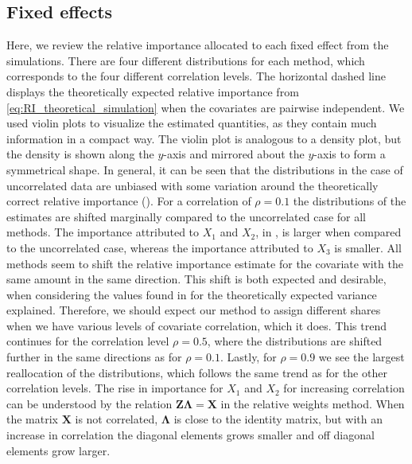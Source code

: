 \subsection{Fixed effects}
\label{sec:relimp_fixed}
Here, we review the relative importance allocated to each fixed effect from the simulations.
There are four different distributions for each method, which corresponds to the four different correlation levels. 
The horizontal dashed line displays the theoretically expected relative importance from \eqref{eq:RI_theoretical_simulation} when the covariates are pairwise independent. We used violin plots to visualize the estimated quantities, as they contain much information in a compact way. The violin plot is analogous to a density plot, but the density is shown along the $y$-axis and mirrored about the $y$-axis to form a symmetrical shape.
\newline
\newline
In general, it can be seen that the distributions in the case of uncorrelated data are unbiased with some variation around the theoretically correct relative importance ().
For a correlation of $\rho=0.1$ the distributions of the estimates are shifted marginally compared to the uncorrelated case for all methods.
The importance attributed to $X_1$ and $X_2$, in , is larger when compared to the uncorrelated case, whereas the importance attributed to $X_3$ is smaller.
All methods seem to shift the relative importance estimate for the covariate with the same amount in the same direction.
This shift is both expected and desirable, when considering the values found in  for the theoretically expected variance explained. 
Therefore, we should expect our method to assign different shares when we have various levels of covariate correlation, which it does.
This trend continues for the correlation level $\rho=0.5$, where the distributions are shifted further in the same directions as for $\rho=0.1$.
Lastly, for $\rho=0.9$ we see the largest reallocation of the distributions, which follows the same trend as for the other correlation levels.
\newline
\newline
The rise in importance for $X_1$ and $X_2$ for increasing correlation can be understood by the relation $\mathbf{Z}\boldsymbol{\Lambda}=\mathbf{X}$ in the relative weights method. 
When the matrix $\mathbf{X}$ is not correlated, $\boldsymbol{\Lambda}$ is close to the identity matrix, but with an increase in correlation the diagonal elements grows smaller and off diagonal elements grow larger.
